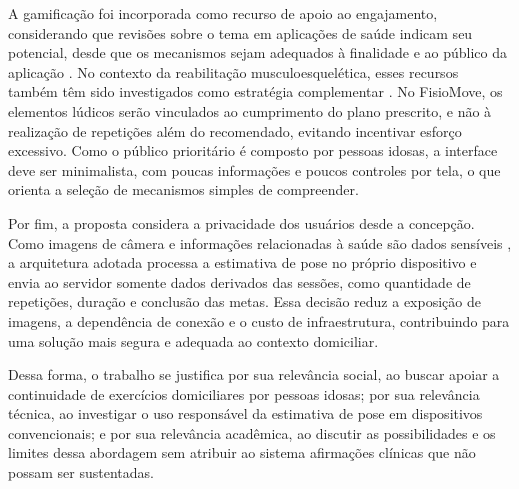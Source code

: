 A gamificação foi incorporada como recurso de apoio ao engajamento, considerando que revisões sobre o tema em aplicações de saúde indicam seu potencial, desde que os mecanismos sejam adequados à finalidade e ao público da aplicação \cite{Sardi2017}. No contexto da reabilitação musculoesquelética, esses recursos também têm sido investigados como estratégia complementar \cite{alfieri2022}. No FisioMove, os elementos lúdicos serão vinculados ao cumprimento do plano prescrito, e não à realização de repetições além do recomendado, evitando incentivar esforço excessivo. Como o público prioritário é composto por pessoas idosas, a interface deve ser minimalista, com poucas informações e poucos controles por tela, o que orienta a seleção de mecanismos simples de compreender.

Por fim, a proposta considera a privacidade dos usuários desde a concepção. Como imagens de câmera e informações relacionadas à saúde são dados sensíveis \cite{LGPD2018}, a arquitetura adotada processa a estimativa de pose no próprio dispositivo e envia ao servidor somente dados derivados das sessões, como quantidade de repetições, duração e conclusão das metas. Essa decisão reduz a exposição de imagens, a dependência de conexão e o custo de infraestrutura, contribuindo para uma solução mais segura e adequada ao contexto domiciliar.

Dessa forma, o trabalho se justifica por sua relevância social, ao buscar apoiar a continuidade de exercícios domiciliares por pessoas idosas; por sua relevância técnica, ao investigar o uso responsável da estimativa de pose em dispositivos convencionais; e por sua relevância acadêmica, ao discutir as possibilidades e os limites dessa abordagem sem atribuir ao sistema afirmações clínicas que não possam ser sustentadas.
